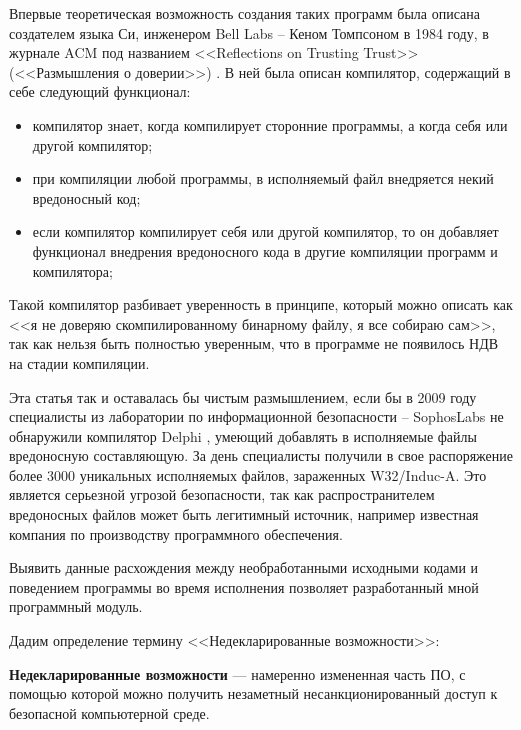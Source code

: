 Впервые теоретическая возможность создания таких программ была описана
создателем языка Си, инженером Bell Labs -- Кеном Томпсоном в 1984 году,
в журнале ACM под названием <<Reflections on Trusting Trust>>
(<<Размышления о доверии>>) \autocite{ken-thompson-hack}.
В ней была описан компилятор, содержащий в себе следующий функционал:
\begin{itemize}
    \item компилятор знает, когда компилирует сторонние программы,
        а когда себя или другой компилятор;
    \item при компиляции любой программы, 
        в исполняемый файл внедряется некий вредоносный код;
    \item если компилятор компилирует себя или другой компилятор,
        то он добавляет функционал внедрения вредоносного кода в 
        другие компиляции программ и компилятора;
\end{itemize}

Такой компилятор разбивает уверенность в принципе, который можно описать
как <<я не доверяю скомпилированному бинарному файлу, я все собираю сам>>,
так как нельзя быть полностью уверенным, что 
в программе не появилось НДВ на стадии компиляции.

Эта статья так и оставалась бы чистым размышлением, если бы в 2009 году специалисты
из лаборатории по информационной безопасности -- SophosLabs не обнаружили компилятор
Delphi \autocite{compile-a-virus}, умеющий добавлять в исполняемые файлы вредоносную составляющую.
За день специалисты получили в свое распоряжение более 3000 уникальных исполняемых
файлов, зараженных W32/Induc-A. Это является серьезной угрозой безопасности, так как
распространителем вредоносных файлов может быть легитимный источник, например
известная компания по производству программного обеспечения.

Выявить данные расхождения между необработанными исходными кодами и 
поведением программы во время исполнения позволяет разработанный мной
программный модуль.

Дадим определение термину <<Недекларированные возможности>>:

\textbf{Недекларированные возможности} \autocite{undeclared-capabilities-antimalware} 
— намеренно измененная часть ПО, с помощью которой можно получить незаметный 
несанкционированный доступ к безопасной компьютерной среде.

